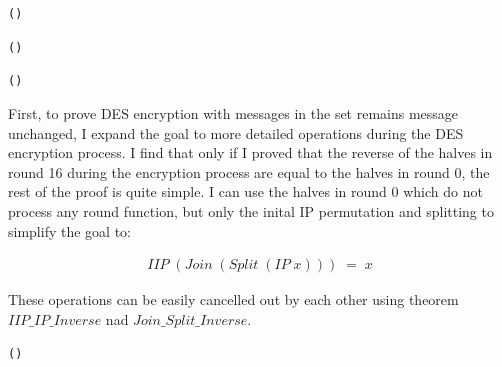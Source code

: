 \documentclass{article}
\begin{document}
\begin{alltt}
   \HOLTokenTurnstile{}  \HOLSymConst{\HOLTokenIn{}}  \HOLSymConst{\HOLTokenConj{}}   \HOLSymConst{=} (\HOLSymConst{,}) \HOLSymConst{\HOLTokenImp{}}
     \HOLSymConst{=} 
\end{alltt}

\begin{alltt}
   \HOLTokenTurnstile{}  \HOLSymConst{\HOLTokenIn{}}  \HOLSymConst{\HOLTokenConj{}}   \HOLSymConst{=} (\HOLSymConst{,}) \HOLSymConst{\HOLTokenImp{}}
     \HOLSymConst{=} 
\end{alltt}

\begin{alltt}
   \HOLTokenTurnstile{}  \HOLSymConst{\HOLTokenIn{}}  \HOLSymConst{\HOLTokenConj{}}   \HOLSymConst{=} (\HOLSymConst{,}) \HOLSymConst{\HOLTokenImp{}}
     \HOLSymConst{=} 
\end{alltt}

First, to prove DES encryption with messages in the set remains message unchanged, I expand the goal to more detailed operations
during the DES encryption process. I find that only
if I proved that the reverse of the halves in round 16 during the encryption process are equal to the halves in round 0,
the rest of the proof is
quite simple. I can use the halves in round 0 which do not process any round function, but only the inital IP permutation
and splitting to simplify the goal to:

\begin{equation}
\begin{split}
 IIP \; (Join \; (Split \; (IP \; x))) \; = \; x
\end{split}
\end{equation}

These operations can be easily cancelled out by each other using theorem $IIP\_IP\_Inverse$ nad $Join\_Split\_Inverse$.

\begin{alltt}
   \HOLTokenTurnstile{}  ( ) \HOLSymConst{=} 
\end{alltt}
\end{document}
